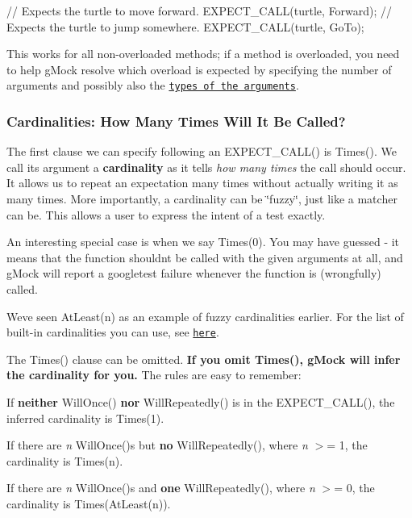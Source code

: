 \begin{DoxyCode}
\textcolor{comment}{// Expects the turtle to move forward.}
EXPECT\_CALL(turtle, Forward);
\textcolor{comment}{// Expects the turtle to jump somewhere.}
EXPECT\_CALL(turtle, GoTo);
\end{DoxyCode}


This works for all non-\/overloaded methods; if a method is overloaded, you need to help g\+Mock resolve which overload is expected by specifying the number of arguments and possibly also the \href{gmock_cook_book.md#SelectOverload}{\tt types of the arguments}.

\subsubsection*{Cardinalities\+: How Many Times Will It Be Called?}

The first clause we can specify following an {\ttfamily E\+X\+P\+E\+C\+T\+\_\+\+C\+A\+L\+L()} is {\ttfamily Times()}. We call its argument a {\bfseries cardinality} as it tells {\itshape how many times} the call should occur. It allows us to repeat an expectation many times without actually writing it as many times. More importantly, a cardinality can be \char`\"{}fuzzy\char`\"{}, just like a matcher can be. This allows a user to express the intent of a test exactly.

An interesting special case is when we say {\ttfamily Times(0)}. You may have guessed -\/ it means that the function shouldn\textquotesingle{}t be called with the given arguments at all, and g\+Mock will report a googletest failure whenever the function is (wrongfully) called.

We\textquotesingle{}ve seen {\ttfamily At\+Least(n)} as an example of fuzzy cardinalities earlier. For the list of built-\/in cardinalities you can use, see \href{gmock_cheat_sheet.md#CardinalityList}{\tt here}.

The {\ttfamily Times()} clause can be omitted. {\bfseries If you omit {\ttfamily Times()}, g\+Mock will infer the cardinality for you.} The rules are easy to remember\+:


\begin{DoxyItemize}
\item If {\bfseries neither} {\ttfamily Will\+Once()} {\bfseries nor} {\ttfamily Will\+Repeatedly()} is in the {\ttfamily E\+X\+P\+E\+C\+T\+\_\+\+C\+A\+L\+L()}, the inferred cardinality is {\ttfamily Times(1)}.
\item If there are {\itshape n} {\ttfamily Will\+Once()}\textquotesingle{}s but {\bfseries no} {\ttfamily Will\+Repeatedly()}, where {\itshape n} $>$= 1, the cardinality is {\ttfamily Times(n)}.
\item If there are {\itshape n} {\ttfamily Will\+Once()}\textquotesingle{}s and {\bfseries one} {\ttfamily Will\+Repeatedly()}, where {\itshape n} $>$= 0, the cardinality is {\ttfamily Times(\+At\+Least(n))}.
\end{DoxyItemize}

